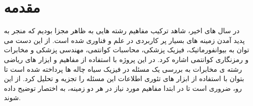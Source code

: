 \section{مقدمه}
در سال های اخیر، شاهد ترکیب مفاهیم رشته هایی به ظاهر مجزا بودیم که منجر به پدید آمدن زمینه های بسیار پر کاربردی در علم و فناوری شده است. از این دست می توان به بیوانفورماتیک، فیزیک پزشکی، محاسبات کوانتمی، مهندسی پزشکی و مخابرات و رمزنگاری کوانتمی اشاره کرد. در این پروژه با استفاده از مفاهیم و ایزار های ریاضی رشته ی مخابرات به بررسی یک مسئله در فیزیک سیاه چاله ها پرداخته شده است تا بتوان با استفاده از ابزار های تئوری اطلاعات این مسئله را تجزیه و تحلیل کرد. از این رو، ضروری است تا در ابتدا مفاهیم مورد نیاز در هر دو زمینه، به اختصار توضیح داده شوند.
